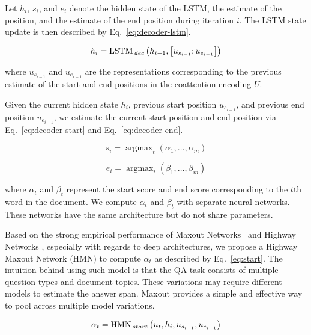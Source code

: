 \documentclass{article} \usepackage{iclr2017_conference,times}
\DeclareMathOperator*{\LSTM}{LSTM}
\DeclareMathOperator*{\HMN}{HMN}
\DeclareMathOperator*{\argmax}{argmax}
\newcommand{\doclen}{m}
\begin{document}
Let $h_i$, $s_i$, and $e_i$ denote the hidden state of the LSTM, the estimate of the position, and the estimate of the end position during iteration $i$.
The LSTM state update is then described by Eq.~\ref{eq:decoder-lstm}.

\begin{equation}
\label{eq:decoder-lstm}
h_i = \LSTM{\hphantom{}}_{dec} \left(
	h_{i-1}, \left[ u_{s_{i-1}} ; u_{e_{i-1}} \right]
\right)
\end{equation}

where $u_{s_{i-1}}$ and $u_{e_{i-1}}$ are the representations corresponding to the previous estimate of the start and end positions in the coattention encoding $U$.

Given the current hidden state $h_i$, previous start position $u_{s_{i-1}}$, and previous end position $u_{e_{i-1}}$, we estimate the current start position and end position via Eq.~\ref{eq:decoder-start} and Eq.~\ref{eq:decoder-end}.

\begin{equation}
\label{eq:decoder-start}
s_i = \argmax_t \left(
	\alpha_1, \hdots, \alpha_{\doclen}
\right)
\end{equation}

\begin{equation}
\label{eq:decoder-end}
e_i = \argmax_t \left(
	\beta_1, \hdots, \beta_{\doclen}
\right)
\end{equation}

where $\alpha_t$ and $\beta_t$ represent the start score and end score corresponding to the $t$th word in the document.
We compute $\alpha_t$ and $\beta_t$ with separate neural networks.
These networks have the same architecture but do not share parameters.

Based on the strong empirical performance of Maxout Networks~\citep{goodfellow2013maxout} and Highway Networks \citep{srivastava2015highway}, especially with regards to deep architectures, we propose a Highway Maxout Network (HMN) to compute $\alpha_t$ as described by Eq.~\ref{eq:start}.
The intuition behind using such model is that the QA task consists of multiple question types and document topics.
These variations may require different models to estimate the answer span.
Maxout provides a simple and effective way to pool across multiple model variations.

\begin{equation}
\label{eq:start}
\alpha_t = \HMN\hphantom{}_{start} \left(
	u_t, h_i, u_{s_{i-1}}, u_{e_{i-1}}
\right)
\end{equation}
\end{document}
